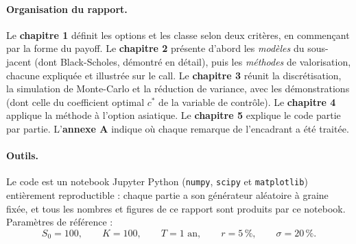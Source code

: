 \paragraph{Organisation du rapport.}
Le \textbf{chapitre 1} définit les options et les classe selon deux critères, en commençant par la forme du payoff.
Le \textbf{chapitre 2} présente d'abord les \emph{modèles} du sous-jacent (dont Black-Scholes, démontré en détail), puis les \emph{méthodes} de valorisation, chacune expliquée et illustrée sur le call.
Le \textbf{chapitre 3} réunit la discrétisation, la simulation de Monte-Carlo et la réduction de variance, avec les démonstrations (dont celle du coefficient optimal $c^*$ de la variable de contrôle).
Le \textbf{chapitre 4} applique la méthode à l'option asiatique.
Le \textbf{chapitre 5} explique le code partie par partie.
L'\textbf{annexe A} indique où chaque remarque de l'encadrant a été traitée.

\paragraph{Outils.} Le code est un notebook Jupyter Python (\texttt{numpy}, \texttt{scipy} et \texttt{matplotlib}) entièrement reproductible : chaque partie a son générateur aléatoire à graine fixée, et tous les nombres et figures de ce rapport sont produits par ce notebook. Paramètres de référence :
\[
S_0 = 100,\qquad K = 100,\qquad T = 1 \text{ an},\qquad r = 5\,\%,\qquad \sigma = 20\,\%.
\]
